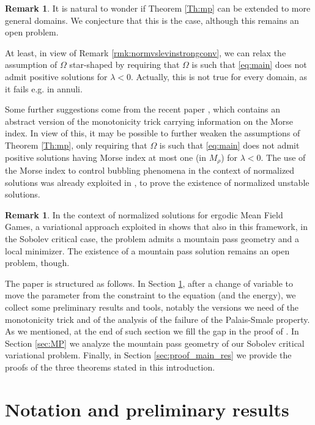 \documentclass[10pt]{article}
\theoremstyle{definition}
\newtheorem{remark}[proposition]{Remark}
\numberwithin{equation}{section}
\begin{document}
\begin{remark}\label{rmk:more_gen}
It is natural to wonder if Theorem \ref{Th:mp} can be extended to more general domains. We 
conjecture that this is the case, although this remains an open problem. 

At least, in view of Remark \ref{rmk:normvslevinstrongconv}, we can relax the assumption 
of $\Omega$ star-shaped by requiring that $\Omega$ is such that \eqref{eq:main} does not admit 
positive solutions for $\lambda<0$. Actually, this is not true for every domain, as it fails 
e.g. in annuli.
 
Some further suggestions come from the recent paper \cite{JJS_absrtact}, which contains an abstract 
version of the monotonicity trick carrying information on the Morse index. In view of this, it may be 
possible to further weaken the assumptions of Theorem \ref{Th:mp}, only requiring that $\Omega$ 
is such that \eqref{eq:main} does not admit positive solutions having Morse index at most one 
(in $M_\rho$) for $\lambda<0$. The use of the Morse index to control bubbling phenomena in the context 
of normalized solutions was already exploited in \cite{ntvAnPDE}, to prove the existence of normalized 
unstable solutions.
\end{remark}

\begin{remark}\label{rmk:mfg_crit}
In the context of normalized solutions for ergodic Mean Field Games, a variational approach exploited 
in \cite{CCV23} shows that also in this framework, in the Sobolev critical case, the problem admits a 
mountain pass geometry and a local minimizer. The existence of a mountain pass solution remains an open problem, though.
\end{remark}

The paper is structured as follows. In Section \ref{sec:prel}, after a change of variable to move the parameter from the constraint to the equation (and the energy), we collect some preliminary results and 
tools, notably the versions we need of the monotonicity trick and of the analysis of the failure of the 
Palais-Smale property. As we mentioned, at the end of such section we fill the gap in the proof of 
\cite[Proposition 4.4]{MR3689156}. In Section \ref{sec:MP} we analyze the mountain pass geometry 
of our Sobolev critical variational problem. Finally, in Section \ref{sec:proof_main_res} we provide the proofs of the 
three theorems stated in this introduction.



\section{Notation and preliminary results}\label{sec:prel}
\end{document}
